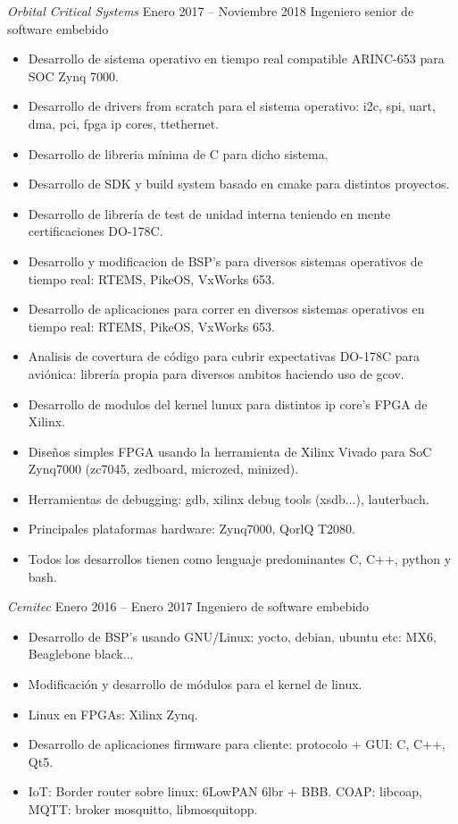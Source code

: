 \documentclass[10pt]{res} %
\begin{document}
\begin{resume}
{\sl Orbital Critical Systems} \hfill Enero 2017 -- Noviembre 2018
\hfill Ingeniero senior de software embebido
\begin{itemize} \itemsep -2pt %
\item Desarrollo de sistema operativo en tiempo real compatible ARINC-653 para SOC Zynq 7000.
\item Desarrollo de drivers from scratch para el sistema operativo: i2c, spi, uart, dma, pci, fpga ip cores, ttethernet.
\item Desarrollo de libreria mínima de C para dicho sistema.
\item Desarrollo de SDK y build system basado en cmake para distintos proyectos.
\item Desarrollo de librería de test de unidad interna teniendo en mente certificaciones DO-178C.
\item Desarrollo y modificacion de BSP's para diversos sistemas operativos de tiempo real: RTEMS, PikeOS, VxWorks 653.
\item Desarrollo de aplicaciones para correr en diversos sistemas operativos en tiempo real: RTEMS, PikeOS, VxWorks 653.
\item Analisis de covertura de código para cubrir expectativas DO-178C para aviónica: librería propia para diversos ambitos haciendo uso de gcov.
\item Desarrollo de modulos del kernel lunux para distintos ip core's FPGA de Xilinx.
\item Diseños simples FPGA usando la herramienta de Xilinx Vivado para SoC Zynq7000 (zc7045, zedboard, microzed, minized).
\item Herramientas de debugging: gdb, xilinx debug tools (xsdb...), lauterbach.
\item Principales plataformas hardware: Zynq7000, QorlQ T2080.
\item Todos los desarrollos tienen como lenguaje predominantes C, C++, python y bash. 
\end{itemize}

{\sl Cemitec} \hfill Enero 2016 -- Enero 2017
\hfill Ingeniero de software embebido
\begin{itemize} \itemsep -2pt %
\item Desarrollo de BSP's usando GNU/Linux: yocto, debian, ubuntu etc: MX6, Beaglebone black...
\item Modificación y desarrollo de módulos para el kernel de linux.
\item Linux en FPGAs: Xilinx Zynq.
\item Desarrollo de aplicaciones firmware para cliente: protocolo + GUI: C, C++, Qt5. 
\item IoT: Border router sobre linux: 6LowPAN 6lbr + BBB. COAP: libcoap, MQTT: broker mosquitto, libmosquitopp.
\end{itemize}


\end{resume}
\end{document}
